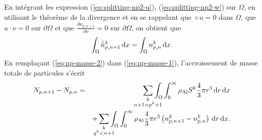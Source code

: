 En intégrant les expression (\ref{eq:splitting-np2-u}),
(\ref{eq:splitting-np2-w}) sur $\Omega$, en utilisant le théorème
de la divergence et en se rappelant que $\div u = 0$ dans $\Omega$,
que $u\cdot\nu = 0$ sur $\partial \Omega$ et que $\frac{\partial
  n_{p,n+1}}{\partial \nu} = 0$ sur $\partial \Omega$, on obtient que
\begin{equation}\label{eq:np-masse-2}
  \int_\Omega \bar{\bar n}_{p,n+1}^k\,\mathrm dx = \int_\Omega n_{p,n}^k\,\mathrm dx.
\end{equation}
En remplaçant (\ref{eq:np-masse-2}) dans (\ref{eq:np-masse-1}),
l'accroissement de masse totale de particules s'écrit
\begin{eqnarray}\label{eq:np-masse-3}
  N_{p,n+1} - N_{p,n} &=&\sum_{\mathclap{\substack{k\\ n+1 = p^k+1}}} \displaystyle\int_\Omega\displaystyle\int_0^\infty \aluminadensity S^k\frac{4}{3}\pi
  r^3\intd{r}\intd{x} \nonumber\\
  && + \sum_{\mathclap{\substack{k \\ q^k < n+1}}} \displaystyle\int_\Omega\displaystyle\int_0^\infty \aluminadensity \frac{4}{3}\pi
    r^3\parent{n_{p,n+1}^k - n_{p,n}^k}\intd{r}\intd{x}.
\end{eqnarray}


